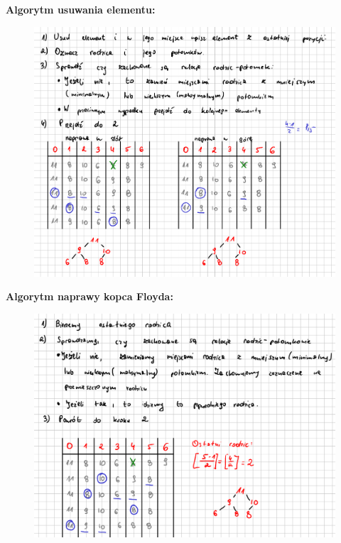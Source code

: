 \documentclass[a4paper,12pt]{article}
\newcommand{\h}[1]{\noindent \bf #1 \rm \\ \noindent}
\begin{document}
\newpage
\h{Algorytm usuwania elementu:}
\begin{figure}[H]
	\centering
	\includegraphics[width=14cm]{fig3.png}
\end{figure}

\newpage
\h{Algorytm naprawy kopca Floyda:}
\begin{figure}[H]
	\centering
	\includegraphics[width=14cm]{fig4.png}
\end{figure}
\end{document}
